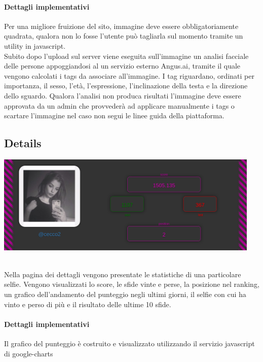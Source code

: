\documentclass{article}
\begin{document}
\paragraph{Dettagli implementativi}
Per una migliore fruizione del sito, immagine deve essere obbligatoriamente quadrata, qualora non lo fosse l'utente può
tagliarla sul momento tramite un utility in javascript.\\
Subito dopo l'upload sul server viene eseguita sull'immagine un analisi facciale delle persone appoggiandosi al un servizio
esterno Angus.ai, tramite il quale vengono calcolati i tags da associare all'immagine.
I tag riguardano, ordinati per importanza, il sesso, l'età, l'espressione, l'inclinazione della testa e la direzione dello sguardo.
Qualora l'analisi non produca risultati l'immagine deve essere approvata da un admin che provvederà ad applicare manualmente
i tags o scartare l'immagine nel caso non segui le linee guida della piattaforma.

\subsection{Details}
\begin{center}\includegraphics[width=0.95\textwidth]{res/details.png}\end{center}\\
Nella pagina dei dettagli vengono presentate le statistiche di una particolare selfie. Vengono visualizzati lo score,
le sfide vinte e perse, la posizione nel ranking, un grafico dell'andamento del punteggio negli ultimi giorni, il selfie
con cui ha vinto e perso di più e il risultato delle ultime 10 sfide.

\paragraph{Dettagli implementativi}
Il grafico del punteggio è costruito e visualizzato utilizzando il servizio javascript di google-charts
\end{document}
